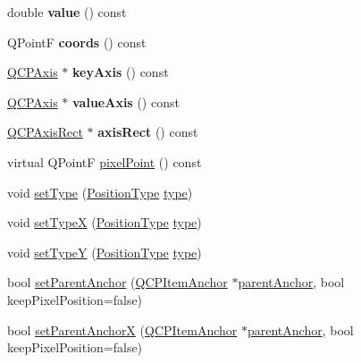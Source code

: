 \begin{DoxyCompactItemize}
double {\bfseries value} () const
\item 
\mbox{\label{class_q_c_p_item_position_aa4ecf5b04c67049c05d37619e090820b}} 
Q\+PointF {\bfseries coords} () const
\item 
\mbox{\label{class_q_c_p_item_position_a9ad34861fbfd8be8b8270c16f879169c}} 
\hyperlink{class_q_c_p_axis}{Q\+C\+P\+Axis} $\ast$ {\bfseries key\+Axis} () const
\item 
\mbox{\label{class_q_c_p_item_position_a356ac94e7e73d88deb7f2841c0d0c734}} 
\hyperlink{class_q_c_p_axis}{Q\+C\+P\+Axis} $\ast$ {\bfseries value\+Axis} () const
\item 
\mbox{\label{class_q_c_p_item_position_ae4081cfe7575f922f403c6e3a2ce7891}} 
\hyperlink{class_q_c_p_axis_rect}{Q\+C\+P\+Axis\+Rect} $\ast$ {\bfseries axis\+Rect} () const
\item 
virtual Q\+PointF \hyperlink{class_q_c_p_item_position_a6cad070c22801295231f5bd6045afe70}{pixel\+Point} () const
\item 
void \hyperlink{class_q_c_p_item_position_aa476abf71ed8fa4c537457ebb1a754ad}{set\+Type} (\hyperlink{class_q_c_p_item_position_aad9936c22bf43e3d358552f6e86dbdc8}{Position\+Type} \hyperlink{class_q_c_p_item_position_abfd74d86bd799306ce0295ffe433bdfc}{type})
\item 
void \hyperlink{class_q_c_p_item_position_a2113b2351d6d00457fb3559a4e20c3ea}{set\+TypeX} (\hyperlink{class_q_c_p_item_position_aad9936c22bf43e3d358552f6e86dbdc8}{Position\+Type} \hyperlink{class_q_c_p_item_position_abfd74d86bd799306ce0295ffe433bdfc}{type})
\item 
void \hyperlink{class_q_c_p_item_position_ac2a454aa5a54c1615c50686601ec4510}{set\+TypeY} (\hyperlink{class_q_c_p_item_position_aad9936c22bf43e3d358552f6e86dbdc8}{Position\+Type} \hyperlink{class_q_c_p_item_position_abfd74d86bd799306ce0295ffe433bdfc}{type})
\item 
bool \hyperlink{class_q_c_p_item_position_ac094d67a95d2dceafa0d50b9db3a7e51}{set\+Parent\+Anchor} (\hyperlink{class_q_c_p_item_anchor}{Q\+C\+P\+Item\+Anchor} $\ast$\hyperlink{class_q_c_p_item_position_a0a87f9dce1af6cc9b510785991bcf1c6}{parent\+Anchor}, bool keep\+Pixel\+Position=false)
\item 
bool \hyperlink{class_q_c_p_item_position_add71461a973927c74e42179480916d9c}{set\+Parent\+AnchorX} (\hyperlink{class_q_c_p_item_anchor}{Q\+C\+P\+Item\+Anchor} $\ast$\hyperlink{class_q_c_p_item_position_a0a87f9dce1af6cc9b510785991bcf1c6}{parent\+Anchor}, bool keep\+Pixel\+Position=false)

\end{DoxyCompactItemize}
